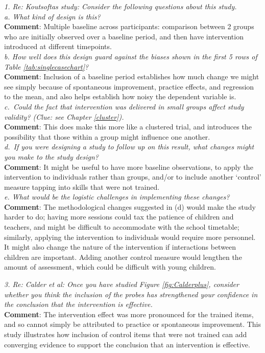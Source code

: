 \documentclass{krantz}
\begin{document}
\emph{1. Re: Koutsoftas study: Consider the following questions about this study.}\\
\emph{a. What kind of design is this?}\\
\textbf{Comment}: Multiple baseline across participants: comparison between 2 groups who are initially observed over a baseline period, and then have intervention introduced at different timepoints.\\
\emph{b. How well does this design guard against the biases shown in the first 5 rows of Table \ref{tab:singlecasechart}?}\\
\textbf{Comment}: Inclusion of a baseline period establishes how much change we might see simply because of spontaneous improvement, practice effects, and regression to the mean, and also helps establish how noisy the dependent variable is.\\
\emph{c.~Could the fact that intervention was delivered in small groups affect study validity? (Clue: see Chapter \ref{cluster}).}\\
\textbf{Comment}: This does make this more like a clustered trial, and introduces the possibility that those within a group might influence one another.\\
\emph{d.~If you were designing a study to follow up on this result, what changes might you make to the study design?}\\
\textbf{Comment}: It might be useful to have more baseline observations, to apply the intervention to individuals rather than groups, and/or to include another `control' measure tapping into skills that were not trained.\\
\emph{e. What would be the logistic challenges in implementing these changes?}\\
\textbf{Comment}: The methodological changes suggested in (d) would make the study harder to do; having more sessions could tax the patience of children and teachers, and might be difficult to accommodate with the school timetable; similarly, applying the intervention to individuals would require more personnel. It might also change the nature of the intervention if interactions between children are important. Adding another control measure would lengthen the amount of assessment, which could be difficult with young children.

\emph{3. Re: Calder et al: Once you have studied Figure \ref{fig:Calderplus}, consider whether you think the inclusion of the probes has strengthened your confidence in the conclusion that the intervention is effective.}\\
\textbf{Comment}: The intervention effect was more pronounced for the trained items, and so cannot simply be attributed to practice or spontaneous improvement. This study illustrates how inclusion of control items that were not trained can add converging evidence to support the conclusion that an intervention is effective.
\end{document}
